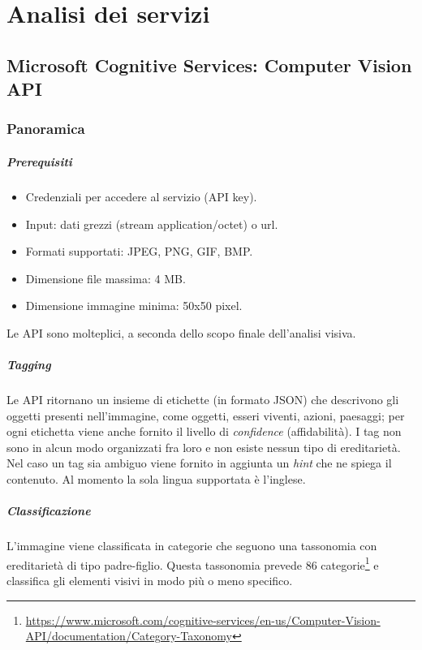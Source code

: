 \documentclass[fleqn,a4paper,11pt]{report}
\begin{document}
{\let\clearpage\relax \chapter{Analisi dei servizi}}
\section{Microsoft Cognitive Services: Computer Vision API}
\subsection{Panoramica}
\paragraph{Prerequisiti}
\begin{itemize}
\item Credenziali per accedere al servizio (API key).
\item Input: dati grezzi (stream application/octet) o url.
\item Formati supportati: JPEG, PNG, GIF, BMP.
\item Dimensione file massima: 4 MB.
\item Dimensione immagine minima: 50x50 pixel.
\end{itemize}
%

Le API\cite{mcs-api} sono molteplici, a seconda dello scopo finale dell'analisi visiva.

\paragraph{Tagging} Le API ritornano un insieme di etichette (in formato JSON) che descrivono gli oggetti presenti nell'immagine, come oggetti, esseri viventi, azioni, paesaggi; per ogni etichetta viene anche fornito il livello di \textit{confidence} (affidabilità). I tag non sono in alcun modo organizzati fra loro e non esiste nessun tipo di ereditarietà.
Nel caso un tag sia ambiguo viene fornito in aggiunta un \textit{hint} che ne spiega il contenuto.
Al momento la sola lingua supportata è l'inglese.

\paragraph{Classificazione} L'immagine viene classificata in categorie che seguono una tassonomia con ereditarietà di tipo padre-figlio. Questa tassonomia prevede 86 categorie\footnote{\url{https://www.microsoft.com/cognitive-services/en-us/Computer-Vision-API/documentation/Category-Taxonomy}} e classifica gli elementi visivi in modo più o meno specifico.
\end{document}
